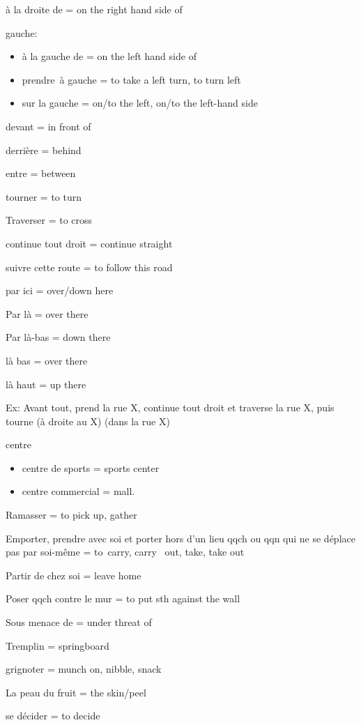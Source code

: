 à la droite de = on the right hand side of

gauche:

\begin{itemize}
\item
  à la gauche de = on the left hand side of
\item
  prendre~à gauche = to take a left turn, to turn left
\item
  {sur} la gauche = on/to the left, on/to the left-hand side
\end{itemize}

devant = in front of

derrière = behind

entre = between

tourner = to turn

Traverser = to cross

continue tout droit = continue straight

{suivre cette route = to follow this road}

{par ici = over/down here}

{Par là = over there}

{Par là-bas = down there~}

{là bas = over there}

{là haut = up there}

Ex: Avant tout, prend la rue X, continue tout droit et traverse la rue
X, puis tourne (à droite au X) (dans la rue X)

centre

\begin{itemize}
\item
  centre de sports = sports center
\item
  centre commercial = mall.
\end{itemize}

Ramasser = to pick up, gather

Emporter, prendre avec soi et porter hors d'un lieu qqch ou qqn qui ne
se déplace pas par soi-même = to~carry, carry~ out, take, take out

Partir de chez soi = leave home

Poser qqch contre le mur = to put sth against the wall~

Sous menace de = under threat of~

Tremplin = springboard~

grignoter = munch on, nibble, snack

La peau du fruit = the skin/peel

se décider = to decide

